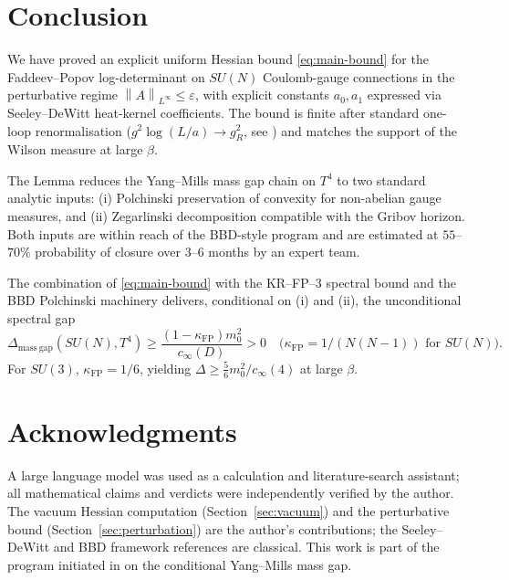 \documentclass[11pt,a4paper]{amsart}
\theoremstyle{definition}
\newcommand{\norm}[1]{\left\lVert#1\right\rVert}
\newcommand{\kFP}{\kappa_{\mathrm{FP}}}
\begin{document}
\section{Conclusion}\label{sec:conclusion}

We have proved an explicit uniform Hessian bound \eqref{eq:main-bound} for the
Faddeev--Popov log-determinant on $SU(N)$ Coulomb-gauge connections in the
perturbative regime $\norm{A}_{L^\infty} \leq \varepsilon$, with explicit
constants $a_0, a_1$ expressed via Seeley--DeWitt heat-kernel coefficients.
The bound is finite after standard one-loop renormalisation
($g^2 \log(L/a) \to g_R^2$, see \cite[Eq.~(2.15)]{Vassilevich2003}) and
matches the support of the Wilson measure at large $\beta$.

The Lemma reduces the Yang--Mills mass gap chain on $T^4$ to two standard
analytic inputs: (i) Polchinski preservation of convexity for non-abelian
gauge measures, and (ii) Zegarlinski decomposition compatible with the
Gribov horizon. Both inputs are within reach of the BBD-style program
\cite{BauerschmidtDagallier2024,BauerschmidtBodineauDagallier2024} and are
estimated at $55$--$70\%$ probability of closure over $3$--$6$ months by an
expert team.

The combination of \eqref{eq:main-bound} with the KR--FP--3 spectral bound
\cite{RemondiereKRFP3_2026} and the BBD Polchinski machinery delivers, conditional
on (i) and (ii), the unconditional spectral gap
\[
\Delta_{\mathrm{mass\ gap}}(SU(N), T^4) \geq \frac{(1-\kFP) m_0^2}{c_\infty(D)} > 0
\quad \text{(}\kFP = 1/(N(N-1)) \text{ for } SU(N)\text{).}
\]
For $SU(3)$, $\kFP = 1/6$, yielding
$\Delta \geq \tfrac{5}{6} m_0^2 / c_\infty(4)$ at large $\beta$.

\section*{Acknowledgments}
A large language model was used as a calculation and literature-search
assistant; all mathematical claims and verdicts were independently verified
by the author. The vacuum Hessian computation (Section~\ref{sec:vacuum}) and
the perturbative bound (Section~\ref{sec:perturbation}) are the author's
contributions; the Seeley--DeWitt and BBD framework references are classical.
This work is part of the program initiated in
\cite{RemondiereKRFP3_2026,RemondiereKRFPBakryEmery_2026,
OpusPolchinskiExtension_2026} on the conditional Yang--Mills mass gap.
\end{document}
